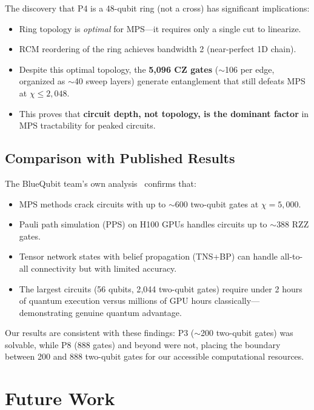 \documentclass[11pt,a4paper]{article}
\newcommand{\bd}{\chi}
\begin{document}
The discovery that P4 is a 48-qubit ring (not a cross) has significant implications:
\begin{itemize}[nosep]
    \item Ring topology is \emph{optimal} for MPS---it requires only a single cut to linearize.
    \item RCM reordering of the ring achieves bandwidth 2 (near-perfect 1D chain).
    \item Despite this optimal topology, the \textbf{5{,}096 CZ gates} ($\sim$106 per edge, organized as $\sim$40 sweep layers) generate entanglement that still defeats MPS at $\bd \leq 2{,}048$.
    \item This proves that \textbf{circuit depth, not topology, is the dominant factor} in MPS tractability for peaked circuits.
\end{itemize}

\subsection{Comparison with Published Results}

The BlueQubit team's own analysis~\cite{bluequbit2025peaked} confirms that:
\begin{itemize}[nosep]
    \item MPS methods crack circuits with up to $\sim$600 two-qubit gates at $\bd = 5{,}000$.
    \item Pauli path simulation (PPS) on H100 GPUs handles circuits up to $\sim$388 RZZ gates.
    \item Tensor network states with belief propagation (TNS+BP) can handle all-to-all connectivity but with limited accuracy.
    \item The largest circuits (56 qubits, 2{,}044 two-qubit gates) require under 2 hours of quantum execution versus millions of GPU hours classically---demonstrating genuine quantum advantage.
\end{itemize}

Our results are consistent with these findings: P3 ($\sim$200 two-qubit gates) was solvable, while P8 (888 gates) and beyond were not, placing the boundary between 200 and 888 two-qubit gates for our accessible computational resources.

\section{Future Work}
\label{sec:future}
\end{document}
